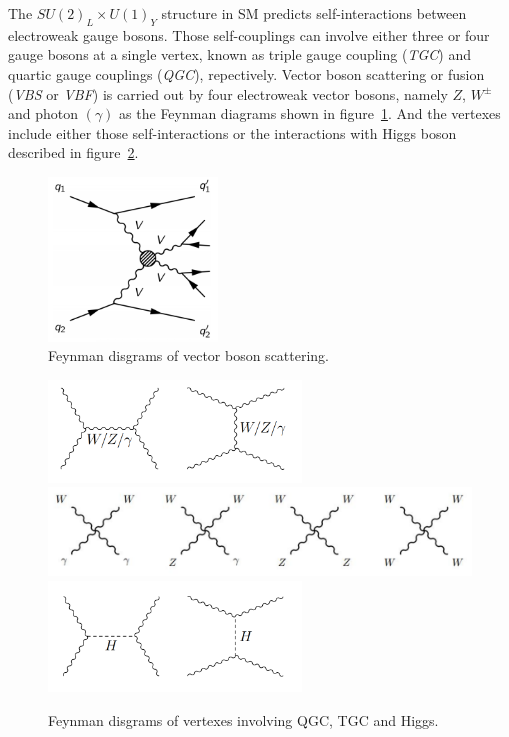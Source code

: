 The $SU(2)_{L} \times U(1)_{Y}$ structure in SM predicts self-interactions between electroweak gauge bosons.
Those self-couplings can involve either three or four gauge bosons at a single vertex, known as triple gauge coupling (\textit{TGC}) and
quartic gauge couplings (\textit{QGC}), repectively.
Vector boson scattering or fusion (\textit{VBS} or \textit{VBF}) is carried out 
by four electroweak vector bosons, namely $Z$, $W^{\pm}$ and photon $(\gamma)$ as the Feynman diagrams shown in figure~\ref{fig:vbs_fd1}. 
And the vertexes include either those self-interactions
or the interactions with Higgs boson described in figure~\ref{fig:vbs_fd2}.
\begin{figure}[!htb]
  \centering
  \includegraphics[width=0.4\textwidth]{figures/Theory/VBS.png} 
  \caption{Feynman disgrams of vector boson scattering.}
  \label{fig:vbs_fd1}
\end{figure}
\begin{figure}[!htb]
  \centering
  \includegraphics[width=0.6\textwidth]{figures/Theory/vbs_tgc.png} \\
  \includegraphics[width=1.0\textwidth]{figures/Theory/vbs_qgc.png} \\
  \includegraphics[width=0.6\textwidth]{figures/Theory/vbs_higgs.png} 
  \caption{Feynman disgrams of vertexes involving QGC, TGC and Higgs.}
  \label{fig:vbs_fd2}
\end{figure}

